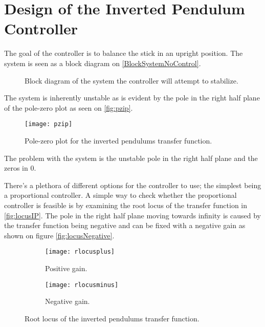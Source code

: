 \graphicspath{{figures/Design/IPController/}}
\chapter{Design of the Inverted Pendulum Controller}\label{sec:IPController}

The goal of the controller is to balance the stick in an upright position. The system is seen as a block diagram on \autoref{BlockSystemNoControl}.
\begin{figure}[htbp]
\centering
\missingfigure{}
\caption{Block diagram of the system the controller will attempt to stabilize.}
\label{fig:BlockSystemNoControl}
\end{figure}

The system is inherently unstable as is evident by the pole in the right half plane of the pole-zero plot as seen on \autoref{fig:pzip}.

\begin{figure}[htbp]
\centering
\texttt{[image: pzip]}
\caption{Pole-zero plot for the inverted pendulums transfer function.}
\label{fig:pzip}
\end{figure}

The problem with the system is the unstable pole in the right half plane and the zeros in 0.

There's a plethora of different options for the controller to use; the simplest being a proportional controller. A simple way to check whether the proportional controller is feasible is by examining the root locus of the transfer function in \autoref{fig:locusIP}. The pole in the right half plane moving towards infinity is caused by the transfer function being negative and can be fixed with a negative gain as shown on figure \autoref{fig:locusNegative}.

\begin{figure}[htbp]
\centering
	\begin{subfigure}{0.45\textwidth}
	\texttt{[image: rlocusplus]}
	\caption{Positive gain.}
	\label{fig:locusIP}
	\end{subfigure}
	\begin{subfigure}{0.45\textwidth}
	\centering
	\texttt{[image: rlocusminus]}
	\caption{Negative gain.}
	\label{fig:locusNegative}
	\end{subfigure}
\caption{Root locus of the inverted pendulums transfer function.}
\end{figure}

